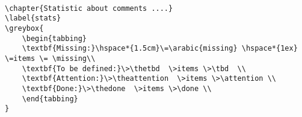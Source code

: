 \documentclass[a4paper,12pt]{article}
\begin{document}
\begin{Verbatim}

\chapter{Statistic about comments ....}
\label{stats}
\greybox{
	\begin{tabbing}
	\textbf{Missing:}\hspace*{1.5cm}\=\arabic{missing} \hspace*{1ex} \=items \= \missing\\
	\textbf{To be defined:}\>\thetbd  \>items \>\tbd  \\
	\textbf{Attention:}\>\theattention  \>items \>\attention \\
	\textbf{Done:}\>\thedone  \>items \>\done \\
	\end{tabbing}
}

\end{Verbatim}

\begin{tabbing}
\end{tabbing}
\end{document}
